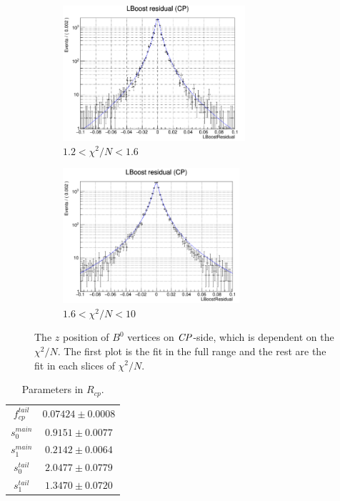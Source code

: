 \begin{figure}[htbp]
	\begin{subfigure}{0.5\linewidth}
		\caption{$1.2<\chi^2/N<1.6$}
		\includegraphics[height=5cm]{figures/residual1.2_1.6}
	\end{subfigure}
	\begin{subfigure}{0.5\linewidth}
		\caption{$1.6<\chi^2/N<10$}
		\includegraphics[height=5cm]{figures/residual1.6_10}
	\end{subfigure}
	\caption{ The $z$ position of $B^0$ vertices on $\it{CP}$-side, which is dependent on the $\chi^2/N$. The first plot is the fit in the full range and the rest are the fit in each slices of $\chi^2/N$.}
	\label{fig:redchi2fit}
\end{figure}

\begin{table}[H]
	\begin{minipage}[b]{1.0\linewidth}
		\centering
		\caption{Parameters in $R_{cp}$.}
		\label{tab:Rcp}
		\begin{tabular}{|c|c|}
			\hline
			$f_{cp}^{tail}$ & $0.07424 \pm 0.0008$\\
			$s_0^{main}$&  $0.9151 \pm 0.0077$ \\
			$s_1^{main}$ & $0.2142\pm 0.0064$\\
			$s_0^{tail}$ &  $2.0477\pm 0.0779$\\
			$s_1^{tail}$  & $1.3470\pm 0.0720$ \\
			\hline
		\end{tabular}
	\end{minipage}
\end{table}

